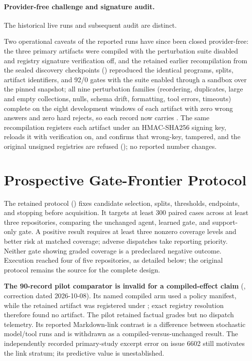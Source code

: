 \paragraph{Provider-free challenge and signature audit.}
The historical live runs and subsequent audit are distinct.

Two operational
caveats of the reported runs have since been closed provider-free: the three
primary artifacts were compiled with the perturbation suite disabled and
registry signature verification off, and the retained earlier recompilation from the sealed
discovery checkpoints ()
reproduced the identical programs, splits, artifact identifiers, and 92/0 gates
with the suite enabled through a sandbox over the pinned snapshot; all nine
perturbation families (reordering, duplicates, large and empty collections,
nulls, schema drift, formatting, tool errors, timeouts) complete on the eight
development windows of each artifact with zero wrong answers and zero hard
rejects, so each record now carries . The
same recompilation registers each artifact under an HMAC-SHA256 signing key,
reloads it with verification on, and confirms that wrong-key, tampered, and the
original unsigned registries are refused
(); no
reported number changes.

\section{Prospective Gate-Frontier Protocol}
\label{app:prospective}

The retained protocol
() fixes
candidate selection, splits, thresholds, endpoints, and stopping before
acquisition. It targets at least 300 paired cases across at least three
repositories, comparing the unchanged agent, learned gate, and support-only
gate. A positive result requires at least three nonzero coverage levels and
better risk at matched coverage; adverse dispatches take reporting priority.
Neither gate showing graded coverage is a predeclared negative outcome.
Execution reached four of five repositories, as detailed below; the original
protocol remains the source for the complete design.

\textbf{The 90-record pilot comparator is invalid for a compiled-effect claim}
(, correction dated 2026-10-08). Its
named compiled arm used a  policy manifest, while the retained
artifact was registered under ; exact registry resolution therefore
found no artifact. The pilot retained factual grades but no dispatch telemetry.
Its reported Markdown-link contrast is a difference between stochastic
model/tool runs and is withdrawn as a compiled-versus-unchanged result. The
independently recorded primary-study excerpt error on issue 6602 still
motivates the link stratum; its predictive value is unestablished.

